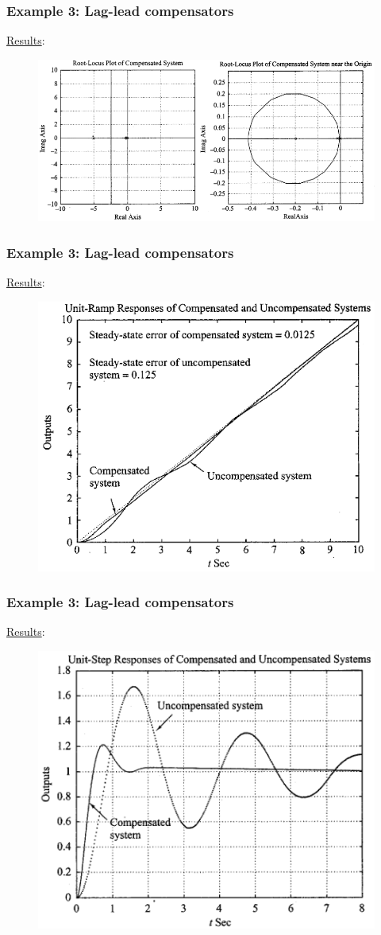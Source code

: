\begin{frame}
	\frametitle{Example 3: Lag-lead compensators}
	\underline{Results}:\\
	\begin{figure}
		\centering
		\includegraphics[width=1\linewidth]{Ex3_rootlocus}
	\end{figure}
\end{frame}

\begin{frame}
	\frametitle{Example 3: Lag-lead compensators}
	\underline{Results}:\\
	\begin{figure}
		\centering
		\includegraphics[width=0.65\linewidth]{Ex3_ramp}
	\end{figure}
\end{frame}

\begin{frame}
	\frametitle{Example 3: Lag-lead compensators}
	\underline{Results}:\\
	\begin{figure}
		\centering
		\includegraphics[width=0.65\linewidth]{Ex3_response}
	\end{figure}
\end{frame}

